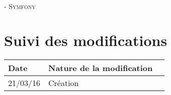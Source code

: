 \documentclass[asi, sansVersion]{picInsa}
\begin{document}
	\begin{center}
		\LARGE
		\textsc{
			\FF{}\\
			 - Symfony
		}
	\end{center}
	\vspace{0.5cm}

	\section*{Suivi des modifications}
		\begin{table}[H]
			\centering
			\begin{tabularx}{18cm}{|p{1.7cm}|X|p{4cm}|}
				\hline
				\rowcolor[gray]{0.90} Date & Nature de la modification \\
				\hline
				
				21/03/16 & Création \\
				\hline
			\end{tabularx}
		\end{table}
\end{document}
